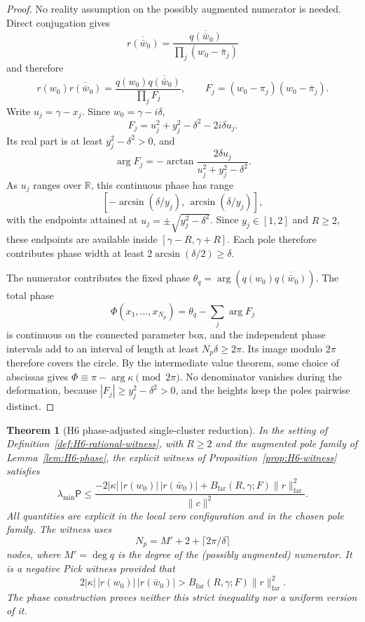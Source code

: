 \documentclass[11pt]{amsart}
\newtheorem{theorem}{Theorem}[section]
\theoremstyle{definition}
\theoremstyle{remark}
\theoremstyle{definition}
\newcommand{\R}{\mathbb{R}}
\begin{document}
\begin{proof}
No reality assumption on the possibly augmented numerator is needed.  Direct conjugation gives
\[
   \overline{r(\bar w_0)}
   =
   \frac{\overline{q(\bar w_0)}}{\prod_j(w_0-\bar\pi_j)}
\]
and therefore
\[
   r(w_0)\overline{r(\bar w_0)}
   =
   \frac{q(w_0)\overline{q(\bar w_0)}}{\prod_jF_j},
   \qquad
   F_j=(w_0-\pi_j)(w_0-\bar\pi_j).
\]
Write $u_j=\gamma-x_j$.  Since $w_0=\gamma-i\delta$,
\[
   F_j=u_j^2+y_j^2-\delta^2-2i\delta u_j.
\]
Its real part is at least $y_j^2-\delta^2>0$, and
\[
   \arg F_j
   =
   -\arctan\frac{2\delta u_j}{u_j^2+y_j^2-\delta^2}.
\]
As $u_j$ ranges over $\R$, this continuous phase has range
\[
   [-\arcsin(\delta/y_j),\,\arcsin(\delta/y_j)],
\]
with the endpoints attained at $u_j=\pm\sqrt{y_j^2-\delta^2}$.  Since $y_j\in[1,2]$ and $R\ge2$,
these endpoints are available inside $[\gamma-R,\gamma+R]$.  Each pole therefore contributes phase
width at least $2\arcsin(\delta/2)\ge\delta$.

The numerator contributes the fixed phase
$\theta_q=\arg(q(w_0)\overline{q(\bar w_0)})$.  The total phase
\[
   \Phi(x_1,\ldots,x_{N_p})
   =
   \theta_q-\sum_j\arg F_j
\]
is continuous on the connected parameter box, and the independent phase intervals add to an interval
of length at least $N_p\delta\ge2\pi$.  Its image modulo $2\pi$ therefore covers the circle.  By the
intermediate value theorem, some choice of abscissas gives
$\Phi\equiv\pi-\arg\kappa\pmod{2\pi}$.  No denominator vanishes during the deformation, because
$|F_j|\ge y_j^2-\delta^2>0$, and the heights keep the poles pairwise distinct.
\end{proof}

\begin{theorem}[H6 phase-adjusted single-cluster reduction]\label{thm:H6-closed}
In the setting of Definition~\ref{def:H6-rational-witness}, with $R\ge2$ and the augmented pole family
of Lemma~\ref{lem:H6-phase}, the explicit witness of Proposition~\ref{prop:H6-witness} satisfies
\[
   \lambda_{\min}\mathsf P
   \le
   \frac{
      -2|\kappa|\,|r(w_0)|\,|r(\bar w_0)|
      +B_{\mathrm{far}}(R,\gamma;F)\|r\|_{\mathrm{far}}^2
   }{\|c\|^2}.
\]
All quantities are explicit in the local zero configuration and in the chosen pole family.  The witness
uses
\[
   N_p=M'+2+\lceil2\pi/\delta\rceil
\]
nodes, where $M'=\deg q$ is the degree of the (possibly augmented) numerator.  It is a negative Pick witness provided that
\[
   2|\kappa|\,|r(w_0)|\,|r(\bar w_0)|
   >B_{\mathrm{far}}(R,\gamma;F)\|r\|_{\mathrm{far}}^2.
\]
The phase construction proves neither this strict inequality nor a uniform version of it.
\end{theorem}
\end{document}
